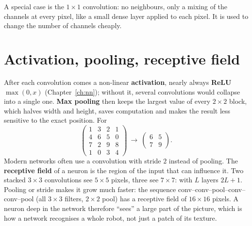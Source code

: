 A special case is the $1\times1$ convolution: no neighbours, only a mixing of the channels at every pixel, like a small dense layer applied to each pixel. It is used to change the number of channels cheaply.

\section*{Activation, pooling, receptive field}
After each convolution comes a non-linear \textbf{activation}, nearly always \textbf{ReLU} $\max(0,x)$ (Chapter~\ref{ch:nn}); without it, several convolutions would collapse into a single one. \textbf{Max pooling} then keeps the largest value of every $2\times2$ block, which halves width and height, saves computation and makes the result less sensitive to the exact position. For
\[
\begin{pmatrix}1&3&2&1\\4&6&5&0\\7&2&9&8\\1&0&3&4\end{pmatrix}
\ \longrightarrow\ \begin{pmatrix}6&5\\7&9\end{pmatrix}.
\]
Modern networks often use a convolution with stride $2$ instead of pooling. The \textbf{receptive field} of a neuron is the region of the input that can influence it. Two stacked $3\times3$ convolutions see $5\times5$ pixels, three see $7\times7$: with $L$ layers $2L+1$. Pooling or stride makes it grow much faster: the sequence conv--conv--pool--conv--conv--pool (all $3\times3$ filters, $2\times2$ pool) has a receptive field of $16\times16$ pixels. A neuron deep in the network therefore ``sees'' a large part of the picture, which is how a network recognises a whole robot, not just a patch of its texture.

